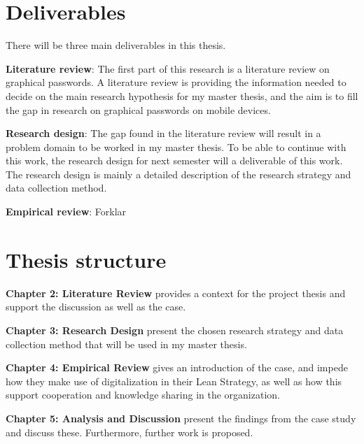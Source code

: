 \section{Deliverables} \label{sec:deliverables}
There will be three main deliverables in this thesis.

{\bf Literature review}: The first part of this research is a literature review on graphical passwords. A literature review is providing the information needed to decide on the main research hypothesis for my master thesis, and the aim is to fill the gap in research on graphical passwords on mobile devices.

{\bf Research design}: The gap found in the literature review will result in a problem domain to be worked in my master thesis. To be able to continue with this work, the research design for next semester will a deliverable of this work. The research design is mainly a detailed description of the research strategy and data collection method.

{\bf Empirical review}: Forklar

\section{Thesis structure} \label{sec:thesis}

{\bf Chapter 2: Literature Review} provides a context for the project thesis and support the discussion as well as the case.

{\bf Chapter 3: Research Design} present the chosen research strategy and data collection method that will be used in my master thesis. 

{\bf Chapter 4: Empirical Review} gives an introduction of the case, and impede how they make use of digitalization in their Lean Strategy, as well as how this support cooperation and knowledge sharing in the organization.

{\bf Chapter 5: Analysis and Discussion} present the findings from the case study and discuss these. Furthermore, further work is proposed. 


\cleardoublepage